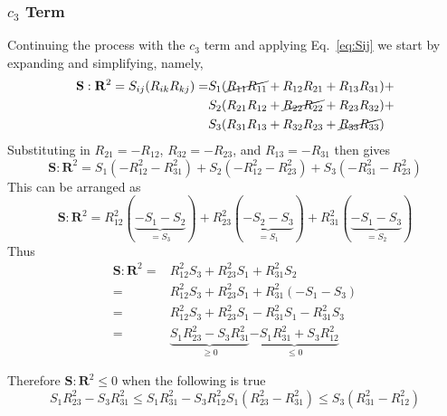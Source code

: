\newcommand{\term}{\mathbf{S}:\mathbf{R}^2}
\subsubsection{$c_{3}$ Term}
Continuing the process with the $c_{3}$ term and applying Eq.~\ref{eq:Sij}
we start by expanding and simplifying, namely,
\begin{equation}
    \begin{split}
        \mathbf{S}:\mathbf{R}^2 =  S_{ij}(R_{ik}R_{kj}) = &  
                S_{1}(\cancel{R_{11} R_{11}} + R_{12} R_{21} + R_{13} R_{31}) +     \\
            &   S_{2}(R_{21} R_{12} + \cancel{R_{22} R_{22}} + R_{23} R_{32}) +     \\
            &   S_{3}(R_{31} R_{13} + R_{32} R_{23} + \cancel{R_{33} R_{33}})
    \end{split}
\end{equation}
Substituting in $R_{21} = -R_{12}$, $R_{32} = -R_{23}$, and $R_{13} = -
R_{31}$ then gives
\begin{equation}
        \term = 
        S_{1} (-R_{12}^2 - R_{31}^2)  +
        S_{2} (-R_{12}^2 - R_{23}^2)  +
        S_{3} (-R_{31}^2 - R_{23}^2)
\end{equation}
This can be arranged as
\begin{equation}
        \term = 
        R_{12}^{2} (\underbrace{-S_{1} - S_{2}}_{= S_{3}}) + 
        R_{23}^{2} (\underbrace{-S_{2} - S_{3}}_{= S_{1}}) + 
        R_{31}^{2} (\underbrace{-S_{1} - S_{3}}_{= S_{2}})  
\end{equation}
Thus
\begin{subequations}
    \begin{align}
        \term = & 
            R_{12}^2 S_{3} + R_{23}^2 S_{1} + R_{31}^2 S_{2}                  \\
         = & R_{12}^2 S_{3} + R_{23}^2 S_{1} + R_{31}^2 (-S_{1} - S_{3})       \\
         = & R_{12}^2 S_{3} + R_{23}^2 S_{1} - R_{31}^2 S_{1} - R_{31}^2 S_{3} \\ 
         = & \underbrace{S_{1} R_{23}^2 - S_{3} R_{31}^{2}}_{\geq 0}          
                \underbrace{-S_{1} R_{31}^2 + S_{3} R_{12}^2}_{\leq 0}
    \end{align}
\end{subequations}

Therefore $\mathbf{S}:\mathbf{R}^2 \leq 0$ when the following is true
\begin{subequations}
    \begin{equation}
        S_{1} R_{23}^2 - S_{3} R_{31}^2 \leq S_{1} R_{31}^2 - S_{3} R_{12}^2
    \end{equation}
    \begin{equation}
        S_{1} (R_{23}^2 - R_{31}^{2}) \leq S_{3} ( R_{31}^2 - R_{12}^2)
    \end{equation}
    \label{eq:c3-inequal}
\end{subequations}     \\

